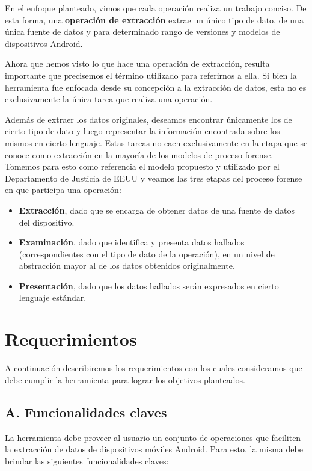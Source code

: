 En el enfoque planteado, vimos que cada operación realiza un trabajo conciso. De esta forma, una \textbf{operación de extracción} extrae un único tipo de dato, de una única fuente de datos y para determinado rango de versiones y modelos de dispositivos Android.

Ahora que hemos visto lo que hace una operación de extracción, resulta importante que precisemos el término utilizado para referirnos a ella. Si bien la herramienta fue enfocada desde su concepción a la extracción de datos, esta no es exclusivamente la única tarea que realiza una operación.

Además de extraer los datos originales, deseamos encontrar únicamente los de cierto tipo de dato y luego representar la información encontrada sobre los mismos en cierto lenguaje. Estas tareas no caen exclusivamente en la etapa que se conoce como extracción en la mayoría de los modelos de proceso forense. Tomemos para esto como referencia el modelo propuesto y utilizado por el Departamento de Justicia de EEUU \cite{eleccrime} y veamos las tres etapas del proceso forense en que participa una operación:

\begin{itemize}
\item \textbf{Extracción}, dado que se encarga de obtener datos de una fuente de datos del dispositivo.
\item \textbf{Examinación}, dado que identifica y presenta datos hallados (correspondientes con el tipo de dato de la operación), en un nivel de abstracción mayor al de los datos obtenidos originalmente.
\item \textbf{Presentación}, dado que los datos hallados serán expresados en cierto lenguaje estándar.
\end{itemize}

\section{Requerimientos}
A continuación describiremos los requerimientos con los cuales consideramos que debe cumplir la herramienta para lograr los objetivos planteados.

\subsection*{A. Funcionalidades claves}
La herramienta debe proveer al usuario un conjunto de operaciones que faciliten la extracción de datos de dispositivos móviles Android. Para esto, la misma debe brindar las siguientes funcionalidades claves:

